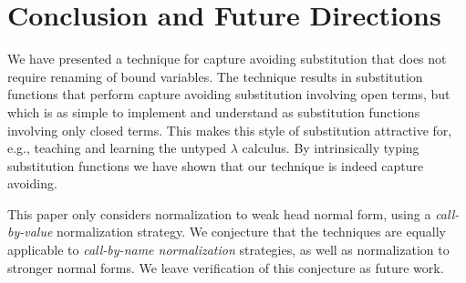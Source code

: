 \section{Conclusion and Future Directions}
\label{sec:conclusion}

We have presented a technique for capture avoiding substitution that does not require renaming of bound variables.
The technique results in substitution functions that perform capture avoiding substitution involving open terms, but which is as simple to implement and understand as substitution functions involving only closed terms.
This makes this style of substitution attractive for, e.g., teaching and learning the untyped $\lambda$ calculus.
By intrinsically typing substitution functions we have shown that our technique is indeed capture avoiding.

This paper only considers normalization to weak head normal form, using a \emph{call-by-value} normalization strategy.
We conjecture that the techniques are equally applicable to \emph{call-by-name normalization} strategies, as well as normalization to stronger normal forms.
We leave verification of this conjecture as future work.

